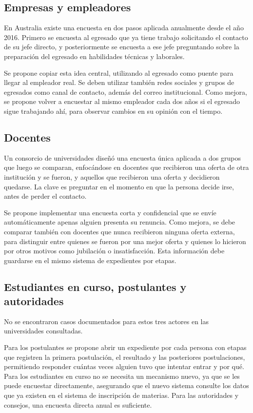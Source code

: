 \documentclass{./plantilla/umss}
\begin{document}
\subsection{Empresas y empleadores}
En Australia existe una encuesta en dos pasos aplicada anualmente desde el año 2016. Primero se encuesta al egresado que ya tiene trabajo solicitando el contacto de su jefe directo, y posteriormente se encuesta a ese jefe preguntando sobre la preparación del egresado en habilidades técnicas y laborales.

Se propone copiar esta idea central, utilizando al egresado como puente para llegar al empleador real. Se deben utilizar también redes sociales y grupos de egresados como canal de contacto, además del correo institucional. Como mejora, se propone volver a encuestar al mismo empleador cada dos años si el egresado sigue trabajando ahí, para observar cambios en su opinión con el tiempo.

\subsection{Docentes}
Un consorcio de universidades diseñó una encuesta única aplicada a dos grupos que luego se comparan, enfocándose en docentes que recibieron una oferta de otra institución y se fueron, y aquellos que recibieron una oferta y decidieron quedarse. La clave es preguntar en el momento en que la persona decide irse, antes de perder el contacto.

Se propone implementar una encuesta corta y confidencial que se envíe automáticamente apenas alguien presenta su renuncia. Como mejora, se debe comparar también con docentes que nunca recibieron ninguna oferta externa, para distinguir entre quienes se fueron por una mejor oferta y quienes lo hicieron por otros motivos como jubilación o insatisfacción. Esta información debe guardarse en el mismo sistema de expedientes por etapas.

\subsection{Estudiantes en curso, postulantes y autoridades}
No se encontraron casos documentados para estos tres actores en las universidades consultadas. 

Para los postulantes se propone abrir un expediente por cada persona con etapas que registren la primera postulación, el resultado y las posteriores postulaciones, permitiendo responder cuántas veces alguien tuvo que intentar entrar y por qué. Para los estudiantes en curso no se necesita un mecanismo nuevo, ya que se les puede encuestar directamente, asegurando que el nuevo sistema consulte los datos que ya existen en el sistema de inscripción de materias. Para las autoridades y consejos, una encuesta directa anual es suficiente.
\end{document}
